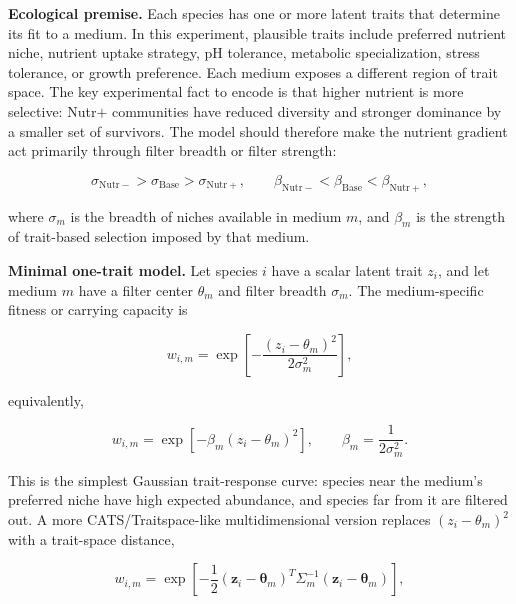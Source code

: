 \documentclass[11pt]{article}
\begin{document}
\noindent\textbf{Ecological premise.}
Each species has one or more latent traits that determine its fit to a medium. In this experiment, plausible traits include preferred nutrient niche, nutrient uptake strategy, pH tolerance, metabolic specialization, stress tolerance, or growth preference. Each medium exposes a different region of trait space. The key experimental fact to encode is that higher nutrient is more selective: Nutr$+$ communities have reduced diversity and stronger dominance by a smaller set of survivors. The model should therefore make the nutrient gradient act primarily through filter breadth or filter strength:

\begin{equation*}
    \sigma_{\mathrm{Nutr}-} > \sigma_{\mathrm{Base}} > \sigma_{\mathrm{Nutr}+},
    \qquad
    \beta_{\mathrm{Nutr}-} < \beta_{\mathrm{Base}} < \beta_{\mathrm{Nutr}+},
\end{equation*}

\noindent where $\sigma_m$ is the breadth of niches available in medium $m$, and $\beta_m$ is the strength of trait-based selection imposed by that medium.

\noindent\textbf{Minimal one-trait model.}
Let species $i$ have a scalar latent trait $z_i$, and let medium $m$ have a filter center $\theta_m$ and filter breadth $\sigma_m$. The medium-specific fitness or carrying capacity is

\begin{equation*}
    w_{i,m}
    =
    \exp\!\left[
        -\frac{(z_i-\theta_m)^2}{2\sigma_m^2}
    \right],
\end{equation*}

\noindent equivalently,

\begin{equation*}
    w_{i,m}
    =
    \exp\!\left[-\beta_m (z_i-\theta_m)^2\right],
    \qquad
    \beta_m = \frac{1}{2\sigma_m^2}.
\end{equation*}

\noindent This is the simplest Gaussian trait-response curve: species near the medium's preferred niche have high expected abundance, and species far from it are filtered out. A more CATS/Traitspace-like multidimensional version replaces $(z_i-\theta_m)^2$ with a trait-space distance,

\begin{equation*}
    w_{i,m}
    =
    \exp\!\left[
        -\frac{1}{2}
        (\mathbf{z}_i-\boldsymbol{\theta}_m)^{T}
        \Sigma_m^{-1}
        (\mathbf{z}_i-\boldsymbol{\theta}_m)
    \right],
\end{equation*}
\end{document}
